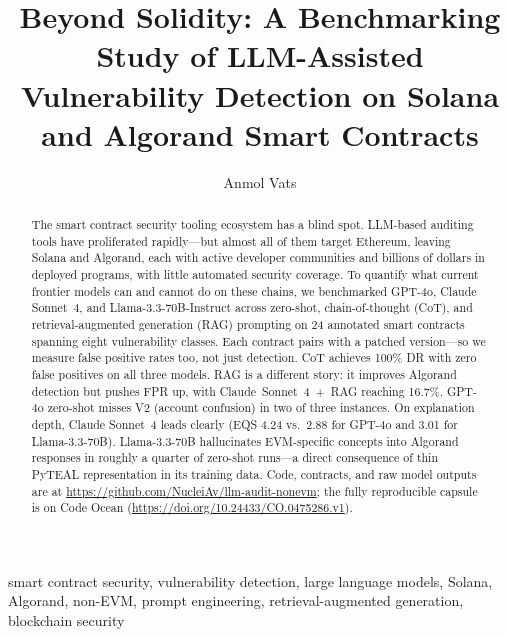 \documentclass[journal]{IEEEtran}
\begin{document}
\title{Beyond Solidity: A Benchmarking Study of LLM-Assisted Vulnerability
Detection on Solana and Algorand Smart Contracts}

\author{Anmol Vats}

\maketitle

\begin{abstract}
The smart contract security tooling ecosystem has a blind spot.
LLM-based auditing tools have proliferated rapidly---but almost all of them
target Ethereum, leaving Solana and Algorand, each with active developer
communities and billions of dollars in deployed programs, with little
automated security coverage.
To quantify what current frontier models can and cannot do on these chains,
we benchmarked GPT-4o, Claude Sonnet~4, and Llama-3.3-70B-Instruct across
zero-shot, chain-of-thought (CoT), and retrieval-augmented generation (RAG)
prompting on 24 annotated smart contracts spanning eight vulnerability classes.
Each contract pairs with a patched version---so we measure false positive
rates too, not just detection.
CoT achieves 100\% DR with zero false positives on all three models.
RAG is a different story: it improves Algorand detection but pushes FPR up,
with Claude~Sonnet~4~+~RAG reaching 16.7\%.
GPT-4o zero-shot misses V2 (account confusion) in two of three instances.
On explanation depth, Claude Sonnet~4 leads clearly (EQS 4.24 vs.\ 2.88
for GPT-4o and 3.01 for Llama-3.3-70B).
Llama-3.3-70B hallucinates EVM-specific concepts into Algorand responses
in roughly a quarter of zero-shot runs---a direct consequence of thin
PyTEAL representation in its training data.
Code, contracts, and raw model outputs are at
\url{https://github.com/NucleiAv/llm-audit-nonevm}; the fully reproducible
capsule is on Code Ocean (\url{https://doi.org/10.24433/CO.0475286.v1}).
\end{abstract}

\begin{IEEEkeywords}
smart contract security, vulnerability detection, large language models,
Solana, Algorand, non-EVM, prompt engineering, retrieval-augmented generation,
blockchain security
\end{IEEEkeywords}
\end{document}
